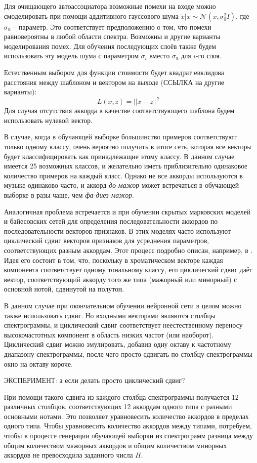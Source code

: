 Для очищающего автоассоциатора возможные помехи на входе можно смоделировать
при помощи аддитивного гауссового шума $\tilde{x}|x \sim \mathcal{N}(x,
\sigma_0^2 I)$, где $\sigma_0$ -- параметр. Это соответствует предположению о
том, что помехи равновероятны в любой области спектра. Возможны и другие
варианты моделирования помех. Для обучения последующих слоёв также будем
использовать эту модель шума с параметром $\sigma_i$ вместо $\sigma_0$ для
$i$-го слоя.

Естественным выбором для функции стоимости будет квадрат евклидова расстояния
между шаблоном и вектором на выходе (ССЫЛКА на другие варианты):
$$L(x,z) = ||x-z||^2$$
Для случая отсутствия аккорда в качестве соответствующего шаблона будем
использовать нулевой вектор.

В случае, когда в обучающей выборке большинство примеров соответствуют только
одному классу, очень вероятно получить в итоге сеть, которая все векторы будет
классифицировать как принадлежащие этому классу. В данном случае имеется 25
возможных классов, и желательно иметь приблизительно одинаковое количество
примеров на каждый класс. Однако не все аккорды используются в музыке одинаково
часто, и аккорд \emph{до-мажор} может встречаться в обучающей выборке в разы
чаще, чем \emph{фа-диез-мажор}.

Аналогичная проблема встречается и при обучении скрытых марковских моделей и
байесовских сетей для определения последовательности аккордов по
последовательности векторов признаков. В этих моделях часто используют
циклический сдвиг векторов признаков для усреднения параметров, соответствующих
разным аккордам. Этот процесс подробно описан, например, в \cite{Sheh2003}. Идея
его состоит в том, что, поскольку в хроматическом векторе каждая компонента
соответствует одному тональному классу, его циклический сдвиг даёт вектор,
соответствующий аккорду того же типа (мажорный или минорный) с основной нотой,
сдвинутой на полутон.

В данном случае при окончательном обучении нейронной сети в целом можно также
использовать сдвиг. Но входными векторами являются столбцы спектрограммы, и
циклический сдвиг соответствует неестественному переносу высокочастотных
компонент в область низких частот (или наоборот). Циклический сдвиг можно
эмулировать, добавив одну октаву к частотному диапазону спектрограммы, после
чего просто сдвигать по столбцу спектрограммы окно на октаву короче.

ЭКСПЕРИМЕНТ: а если делать просто циклический сдвиг?

При помощи такого сдвига из каждого столбца спектрограммы получается 12
различных столбцов, соответствующих 12 аккордам одного типа с разными основными
нотами. Это позволяет уравновесить количество аккордов в пределах одного типа.
Чтобы уравновесить количество аккордов между типами, потребуем, чтобы в процессе
генерации обучающей выборки из спектрограмм разница между общим количеством
мажорных аккордов и общим количеством минорных аккордов не превосходила
заданного числа $H$.


